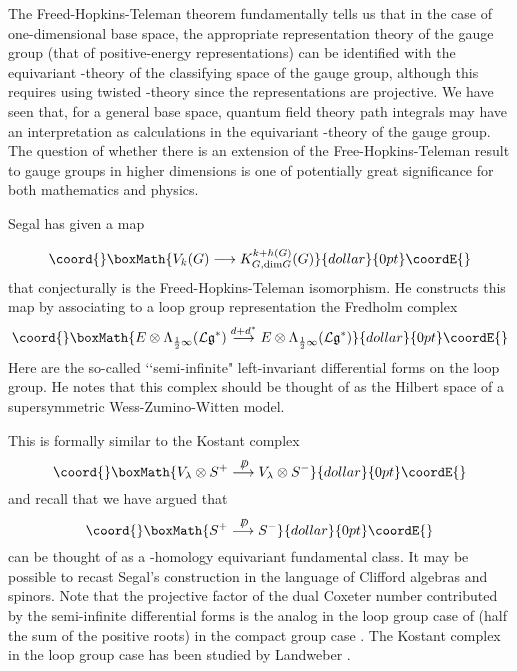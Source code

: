 \documentclass[a4paper,a4paper]{article}
\theoremstyle{conjecture}
\def\Slash#1{#1\!\!\!\!/}
\def\Dirac{\Slash D}
\begin{document}
The Freed-Hopkins-Teleman theorem fundamentally tells us that in the case of one-dimensional base space, 
the appropriate representation theory of the gauge group (that of positive-energy representations) can
be identified with the equivariant \coordHE{}-theory of the classifying space of the gauge group, although this 
requires using twisted \coordHE{}-theory since the representations are projective.  We have seen that, for a
general base space,
quantum field theory path integrals may have an interpretation as calculations in the equivariant
\coordHE{}-theory of the gauge group.  The question of whether there is an extension of the 
Free-Hopkins-Teleman result to gauge groups in higher dimensions is one of potentially great
significance for both mathematics and physics. 

Segal has given\cite{Segal-Rutgers} a map

$$\coord{}\boxMath{V_k(G)\longrightarrow K_{G,\text {dim} G}^{k+h(G)}(G)}{dollar}{0pt}\coordE{}$$ that conjecturally is the
Freed-Hopkins-Teleman isomorphism.  He constructs this map by associating to a loop group representation
\coordHE{} the Fredholm complex 
$$\coord{}\boxMath{E\otimes \Lambda_{\frac{1}{2}\infty}(\mathcal L\mathfrak
g^*)\stackrel{d+d^*}\longrightarrow E\otimes \Lambda_{\frac{1}{2}\infty}(\mathcal L\mathfrak g^*)}{dollar}{0pt}\coordE{}$$ 
Here
\coordHE{} are the so-called \lq\lq semi-infinite" left-invariant
differential forms on the loop group.  He notes that this complex should be thought of as the Hilbert
space of a supersymmetric Wess-Zumino-Witten model.

This is formally similar to the Kostant complex
$$\coord{}\boxMath{V_\lambda\otimes S^+\stackrel{\Dirac}\longrightarrow V_\lambda\otimes S^-}{dollar}{0pt}\coordE{}$$
and recall that we have argued that
$$\coord{}\boxMath{S^+\stackrel{\Dirac}\longrightarrow S^-}{dollar}{0pt}\coordE{}$$
can be thought of as a \coordHE{}-homology equivariant fundamental class.  It may be possible to recast Segal's
construction in the language of Clifford algebras and spinors.  Note that the projective factor of the
dual Coxeter number contributed by the semi-infinite differential forms is the analog in the loop
group case of \myHighlight{$\delta$}\coordHE{} (half the sum of the positive roots) in the compact group case \cite{Freed1}.
The Kostant complex in the loop group case has been studied by Landweber \cite{Landweber2}.
\end{document}

